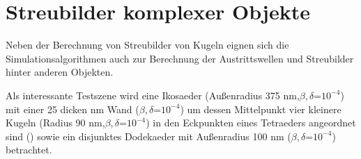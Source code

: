 \section{Streubilder komplexer Objekte}
Neben der Berechnung von Streubilder von Kugeln eignen sich die Simulationsalgorithmen auch zur Berechnung der Austrittswellen und Streubilder hinter anderen Objekten.

Als interessante Testszene wird eine Ikosaeder (Außenradius 375 \si{nm},$\beta,\delta$=$10^{-4}$) mit einer 25 dicken \si{nm} Wand ($\beta,\delta$=$10^{-4}$) um dessen Mittelpunkt vier kleinere Kugeln (Radius 90 \si{nm},$\beta,\delta$=$10^{-4}$) in den Eckpunkten eines Tetraeders angeordnet sind () sowie ein disjunktes Dodekaeder mit Außenradius 100 \si{nm} ($\beta,\delta$=$10^{-4}$) betrachtet. 

